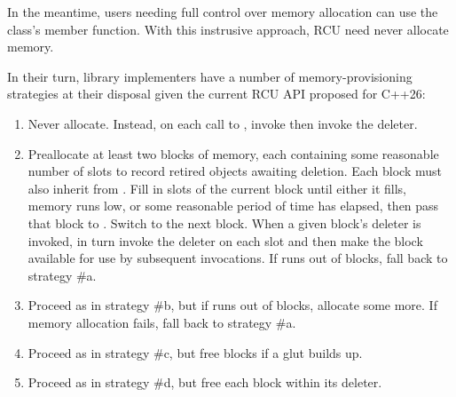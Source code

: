 \begin{enumerate}
	In the meantime, users needing full control over memory allocation
	can use the  class's 
	member function.
	With this instrusive approach, RCU need never allocate memory.

	In their turn, library implementers have a number of
	 memory-provisioning strategies at their
	disposal given the current RCU API proposed for C++26:

	\begin{enumerate}
	\item	Never allocate.
		Instead, on each call to , invoke
		 then invoke the deleter.
	\item	Preallocate at least two blocks of memory, each containing
		some reasonable number of slots to record retired objects
		awaiting deletion.
		Each block must also inherit from .
		Fill in slots of the current block until either it fills,
		memory runs low, or some reasonable period of time has
		elapsed, then pass that block to .
		Switch to the next block.
		When a given block's deleter is invoked, in turn invoke
		the deleter on each slot and then make the block available
		for use by subsequent  invocations.
		If  runs out of blocks, fall back
		to strategy \#a.
	\item	Proceed as in strategy \#b, but if 
		runs out of blocks, allocate some more.
		If memory allocation fails, fall back to strategy \#a.
	\item	Proceed as in strategy \#c, but free blocks if a glut
		builds up.
	\item	Proceed as in strategy \#d, but free each block within
		its deleter.
	\end{enumerate}


\end{enumerate}
